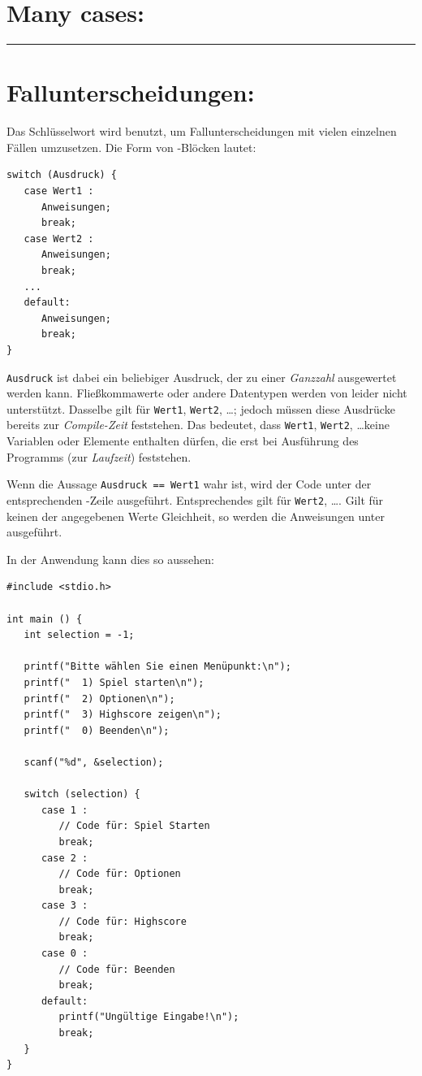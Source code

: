 \section{Many cases: }


\rule{\textwidth}{2pt}
\newpage


\section{Fallunterscheidungen: }
Das Schlüsselwort  wird benutzt, um Fallunterscheidungen mit vielen einzelnen Fällen umzusetzen. Die Form von -Blöcken lautet:

\begin{codebox}
\begin{verbatim}
switch (Ausdruck) {
   case Wert1 :
      Anweisungen;
      break;
   case Wert2 :
      Anweisungen;
      break;
   ...
   default:
      Anweisungen;
      break;
}
\end{verbatim}
\end{codebox}

\texttt{Ausdruck} ist dabei ein beliebiger Ausdruck, der zu einer \emph{Ganzzahl} ausgewertet werden kann. Fließkommawerte oder andere Datentypen werden von  leider nicht unterstützt. Dasselbe gilt für \texttt{Wert1}, \texttt{Wert2}, \ldots; jedoch müssen diese Ausdrücke bereits zur \emph{Compile-Zeit} feststehen. Das bedeutet, dass \texttt{Wert1}, \texttt{Wert2}, \ldots keine Variablen oder Elemente enthalten dürfen, die erst bei Ausführung des Programms (zur \emph{Laufzeit}) feststehen.

Wenn die Aussage \texttt{Ausdruck == Wert1} wahr ist, wird der Code unter der entsprechenden -Zeile ausgeführt. Entsprechendes gilt für \texttt{Wert2}, \ldots. Gilt für keinen der angegebenen Werte Gleichheit, so werden die Anweisungen unter  ausgeführt.

In der Anwendung kann dies so aussehen:

\begin{codebox}
\begin{verbatim}
#include <stdio.h>

int main () {
   int selection = -1;

   printf("Bitte wählen Sie einen Menüpunkt:\n");
   printf("  1) Spiel starten\n");
   printf("  2) Optionen\n");
   printf("  3) Highscore zeigen\n");
   printf("  0) Beenden\n");

   scanf("%d", &selection);

   switch (selection) {
      case 1 :
         // Code für: Spiel Starten
         break;
      case 2 :
         // Code für: Optionen
         break;
      case 3 :
         // Code für: Highscore
         break;
      case 0 :
         // Code für: Beenden
         break;
      default:
         printf("Ungültige Eingabe!\n");
         break;
   }
}
\end{verbatim}
\end{codebox}

